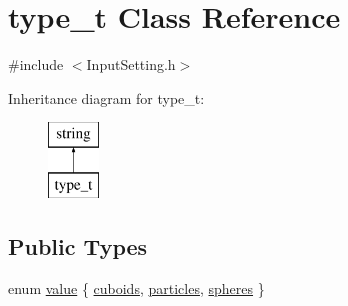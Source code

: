 \hypertarget{classtype__t}{\section{type\-\_\-t Class Reference}
\label{classtype__t}
}


{\ttfamily \#include $<$Input\-Setting.\-h$>$}

Inheritance diagram for type\-\_\-t\-:\begin{figure}[H]
\begin{center}
\leavevmode
\includegraphics[height=2.000000cm]{classtype__t}
\end{center}
\end{figure}
\subsection*{Public Types}
\begin{DoxyCompactItemize}
\item 
enum \hyperlink{classtype__t_a2cd65d363cac2eb0d81f2e61f5b6bcff}{value} \{ \hyperlink{classtype__t_a2cd65d363cac2eb0d81f2e61f5b6bcffa409d3782b4f6927afcc69102658ed168}{cuboids}, 
\hyperlink{classtype__t_a2cd65d363cac2eb0d81f2e61f5b6bcffa05a7bd0ffe485d63238c8662602324fd}{particles}, 
\hyperlink{classtype__t_a2cd65d363cac2eb0d81f2e61f5b6bcffa7d69ee9ff344652e998bbe551581ab24}{spheres}
 \}
\end{DoxyCompactItemize}
